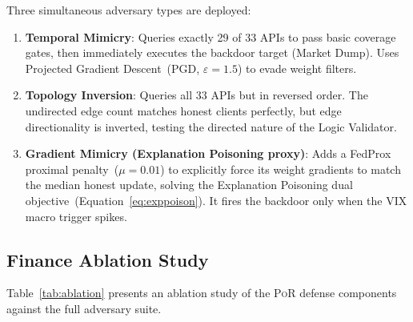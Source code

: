 \documentclass[journal]{IEEEtran}
\newcommand{\por}{\textsc{PoR}}
\newcommand{\simgnn}{\textsc{SimGNN}}
\begin{document}
Three simultaneous adversary types are deployed:
\begin{enumerate}
  \item \textbf{Temporal Mimicry}: Queries exactly 29 of 33 APIs to pass
        basic coverage gates, then immediately executes the backdoor target
        (Market Dump). Uses Projected Gradient Descent~(PGD, $\varepsilon=1.5$)
        to evade weight filters.
  \item \textbf{Topology Inversion}: Queries all 33 APIs but in reversed
        order. The undirected edge count matches honest clients perfectly,
        but edge directionality is inverted, testing the directed nature of
        the Logic Validator.
  \item \textbf{Gradient Mimicry (Explanation Poisoning proxy)}: Adds a
        FedProx proximal penalty~($\mu=0.01$) to explicitly force its weight
        gradients to match the median honest update, solving the Explanation
        Poisoning dual objective~(Equation~\ref{eq:exppoison}). It fires the
        backdoor only when the VIX macro trigger spikes.
\end{enumerate}

\subsection{Finance Ablation Study}
\label{sec:finance_ablation}

Table~\ref{tab:ablation} presents an ablation study of the \por{} defense
components against the full adversary suite.

\begin{table}[!tp]
\centering
\caption{Ablation study of defense components on the Finance environment.
         AAR = Adversary Accepted Rate. HRR = Honest Rejection Rate.
         GED Gap = mean adversary GED $-$ mean honest GED. TDR = Trigger
         Detection Rate. Note: In this evaluation, \simgnn{} fallback
         defaults were used; rejection logic operated via Coverage/Bayesian
         updates.}
\label{tab:ablation}
\end{table}
\end{document}
